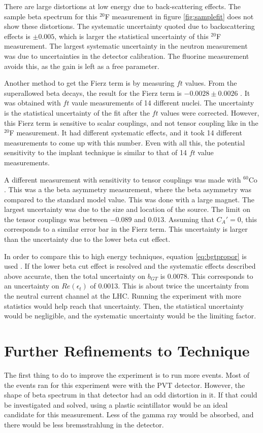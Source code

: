 \documentclass[../MaxHughesThesis.tex]{subfiles}
\begin{document}
There are large distortions at low energy due to back-scattering effects. 
The sample beta spectrum for this $^{20}$F measurement in figure \ref{fig:samplefit} does not show these distortions.
The systematic uncertainty quoted due to backscattering effects is $\pm 0.005$, which is larger the statistical uncertainty of this $^{20}$F measurement.
The largest systematic uncertainty in the neutron measurement was due to uncertainties in the detector calibration.
The fluorine measurement avoids this, as the gain is left as a free parameter.

Another method to get the Fierz term is by measuring $ft$ values.
From the superallowed beta decays, the result for the Fierz term is $-0.0028 \pm 0.0026$ \cite{Har17}.
It was obtained with $ft$ vaule measurements of 14 different nuclei. 
The uncertainty is the statistical uncertainty of the fit after the $ft$ values were corrected.
However, this Fierz term is sensitive to scalar couplings, and not tensor coupling like in the $^{20}$F measurement.
It had different systematic effects, and it took 14 different measurements to come up with this number.
Even with all this, the potential sensitivity to the implant technique is similar to that of 14 $ft$ value measurements.

A different measurement with sensitivity to tensor couplings was made with $^{60}$Co \cite{Wau10}.
This was a the beta asymmetry measurement, where the beta asymmetry was compared to the standard model value.
This was done with a large magnet. 
The largest uncertainty was due to the size and location of the source.
The limit on the tensor couplings was between $-0.089$ and $0.013$.
Assuming that $C_{A}' = 0$, this corresponds to a similar error bar in the Fierz term.
This uncertainty is larger than the uncertainty due to the lower beta cut effect.

In order to compare this to high energy techniques, equation \ref{eq:bgtpropor} is used \cite{Gon19}.
If the lower beta cut effect is resolved and the systematic effects described above accurate, then the total uncertainty on $b_{GT}$ is 0.0078. 
This corresponds to an uncertainty on $Re(\epsilon_{t})$ of 0.0013.
This is about twice the uncertainty from the neutral current channel at the LHC. 
Running the experiment with more statistics would help reach that uncertainty.
Then, the statistical uncertainty would be negligible, and the systematic uncertainty would be the limiting factor. 

\section{Further Refinements to Technique}
The first thing to do to improve the experiment is to run more events.
Most of the events ran for this experiment were with the PVT detector.
However, the shape of beta spectrum in that detector had an odd distortion in it.
If that could be investigated and solved, using a plastic scintillator would be an ideal candidate for this measurement.
Less of the gamma ray would be absorbed, and there would be less bremsstrahlung in the detector.
\end{document}
